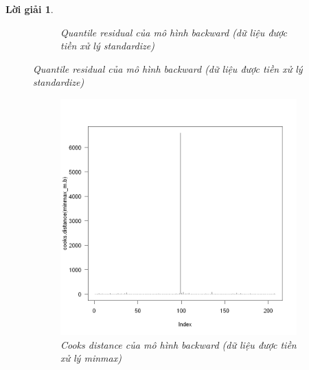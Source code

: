 \documentclass[14pt, a4paper]{article}
\theoremstyle{sltheorem}
\theoremstyle{soltheorem}
\newtheorem*{loigiai}{Lời giải}
\begin{document}
\begin{loigiai}
\begin{figure}[h!]
\begin{subfigure}[b]{0.4\textwidth}
            \caption{Quantile residual của mô hình backward (dữ liệu được tiền xử lý standardize)}
        \end{subfigure}
        \label{fig:Quantile-resid-mb}
    \end{figure}


    \begin{figure}[h!]
        \centering
        \begin{subfigure}[b]{0.4\textwidth}
            \centering
            \includegraphics[width=\textwidth]{figures/minmax_mb_cooks.png}
            \caption{Cooks distance của mô hình backward (dữ liệu được tiền xử lý minmax)}
        \end{subfigure}
        \hfill
        \begin{subfigure}[b]{0.4\textwidth}
            \centering

\end{subfigure}
\end{figure}
\end{loigiai}
\end{document}
